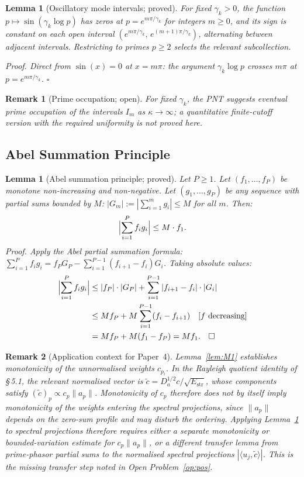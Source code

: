 \documentclass[11pt]{article}
\newtheorem{lemma}[theorem]{Lemma}
\newtheorem*{remark}{Remark}
\newcommand{\Estr}{E_{\mathrm{str}}}
\newcommand{\Da}{D_a}
\begin{document}
\begin{lemma}[Oscillatory mode intervals; proved]\label{lem:M2a}
For fixed $\gamma_k > 0$, the function $p\mapsto\sin(\gamma_k\log p)$
has zeros at $p = e^{m\pi/\gamma_k}$ for integers $m\ge 0$,
and its sign is constant on each open interval
$(e^{m\pi/\gamma_k},\, e^{(m+1)\pi/\gamma_k})$,
alternating between adjacent intervals.
Restricting to primes $p\ge 2$ selects the relevant subcollection.

\emph{Proof.}
Direct from $\sin(x)=0$ at $x=m\pi$: the argument
$\gamma_k\log p$ crosses $m\pi$ at $p = e^{m\pi/\gamma_k}$. $\square$
\end{lemma}

\begin{remark}[Prime occupation; open]
For fixed $\gamma_k$, the PNT suggests eventual prime occupation
of the intervals $I_m$ as $\kappa\to\infty$; a quantitative
finite-cutoff version with the required uniformity is not proved here.
\end{remark}

\subsection{Abel Summation Principle}

\begin{lemma}[Abel summation principle; proved]\label{lem:M3}
Let $P\geq 1$.
Let $(f_1,\ldots,f_P)$ be monotone non-increasing and non-negative.
Let $(g_1,\ldots,g_P)$ be any sequence with partial sums bounded by $M$:
$|G_m| := |\sum_{i=1}^m g_i|\leq M$ for all $m$.
Then:
\[
\Bigl|\sum_{i=1}^P f_i g_i\Bigr| \leq M\cdot f_1.
\]
\emph{Proof.}
Apply the Abel partial summation formula:
$\sum_{i=1}^P f_i g_i = f_P G_P - \sum_{i=1}^{P-1}(f_{i+1}-f_i)G_i$.
Taking absolute values:
\begin{align*}
\Bigl|\sum_{i=1}^P f_i g_i\Bigr|
&\leq |f_P|\cdot|G_P| + \sum_{i=1}^{P-1}|f_{i+1}-f_i|\cdot|G_i| \\
&\leq Mf_P + M\sum_{i=1}^{P-1}(f_i-f_{i+1})
 \quad\text{[$f$ decreasing]} \\
&= Mf_P + M(f_1-f_P) = Mf_1. \quad\square
\end{align*}
\end{lemma}

\begin{remark}[Application context for Paper~4]
Lemma~\ref{lem:M1} establishes monotonicity of the unnormalised
weights $c_{p_i}$.
In the Rayleigh quotient identity of \S\,5.1, the relevant
normalised vector is $\tilde{c} = \Da^{1/2}c/\sqrt{\Estr}$,
whose components satisfy $(\tilde{c})_p \propto c_p\|a_p\|$.
Monotonicity of $c_p$ therefore does not by itself imply
monotonicity of the weights entering the spectral projections,
since $\|a_p\|$ depends on the zero-sum profile and may
disturb the ordering.
Applying Lemma~\ref{lem:M3} to spectral projections therefore
requires either a separate monotonicity or bounded-variation
estimate for $c_p\|a_p\|$, or a different transfer lemma from
prime-phasor partial sums to the normalised spectral projections
$|\langle u_j,\tilde{c}\rangle|$.
This is the missing transfer step noted in Open Problem~\ref{op:pos}.
\end{remark}
\end{document}
